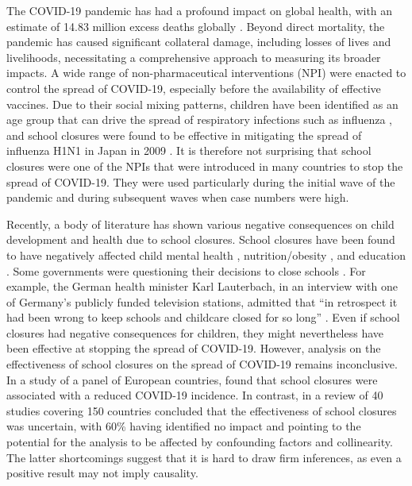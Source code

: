\documentclass[
  number]{elsarticle}
\begin{document}
The COVID-19 pandemic has had a profound impact on global health, with
an estimate of 14.83 million excess deaths globally
\citep{msemburi2023estimates}. Beyond direct mortality, the pandemic has
caused significant collateral damage, including losses of lives and
livelihoods, necessitating a comprehensive approach to measuring its
broader impacts. A wide range of non-pharmaceutical interventions (NPI)
were enacted to control the spread of COVID-19, especially before the
availability of effective vaccines. Due to their social mixing patterns,
children have been identified as an age group that can drive the spread
of respiratory infections such as influenza \citep{moser2018estimating},
and school closures were found to be effective in mitigating the spread
of influenza H1N1 in Japan in 2009 \citep{kawano2015substantial}. It is
therefore not surprising that school closures were one of the NPIs that
were introduced in many countries to stop the spread of COVID-19. They
were used particularly during the initial wave of the pandemic and
during subsequent waves when case numbers were high.

Recently, a body of literature has shown various negative consequences
on child development and health due to school closures. School closures
have been found to have negatively affected child mental health
\citep{moulin2022longitudinal}, nutrition/obesity
\citep{sugimoto2023temporal}, and education
\citep{lerkkanen2023reading}. Some governments were questioning their
decisions to close schools \citep{de2021determines}. For example, the
German health minister Karl Lauterbach, in an interview with one of
Germany's publicly funded television stations, admitted that ``in
retrospect it had been wrong to keep schools and childcare closed for so
long'' \citep{ard2023lauterbach}. Even if school closures had negative
consequences for children, they might nevertheless have been effective
at stopping the spread of COVID-19. However, analysis on the
effectiveness of school closures on the spread of COVID-19 remains
inconclusive. In a study of a panel of European countries,
\citep{alfano2022effects} found that school closures were associated
with a reduced COVID-19 incidence. In contrast, \citep{walsh2021school}
in a review of 40 studies covering 150 countries concluded that the
effectiveness of school closures was uncertain, with 60\% having
identified no impact and pointing to the potential for the analysis to
be affected by confounding factors and collinearity. The latter
shortcomings suggest that it is hard to draw firm inferences, as even a
positive result may not imply causality.
\end{document}
